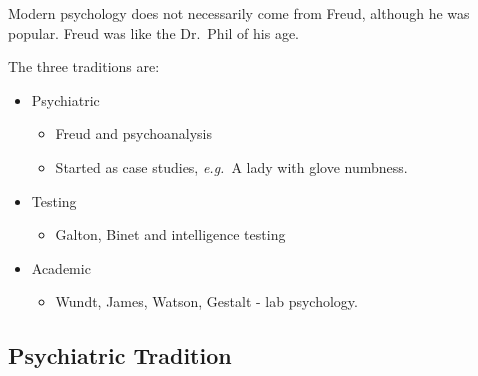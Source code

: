 \documentclass[12pt]{article}
\begin{document}
Modern psychology does not necessarily come from Freud, although he was popular.
Freud was like the Dr.\ Phil of his age.

The three traditions are:
\begin{itemize}
    \item Psychiatric
        \begin{itemize}
            \item Freud and psychoanalysis
            \item Started as case studies, \textit{e.g.}\ A lady with glove numbness.
        \end{itemize}
    \item Testing
        \begin{itemize}
            \item Galton, Binet and intelligence testing
        \end{itemize}
    \item Academic
        \begin{itemize}
            \item Wundt, James, Watson, Gestalt - lab psychology.
        \end{itemize}
\end{itemize}

\subsection*{Psychiatric Tradition}
\end{document}
